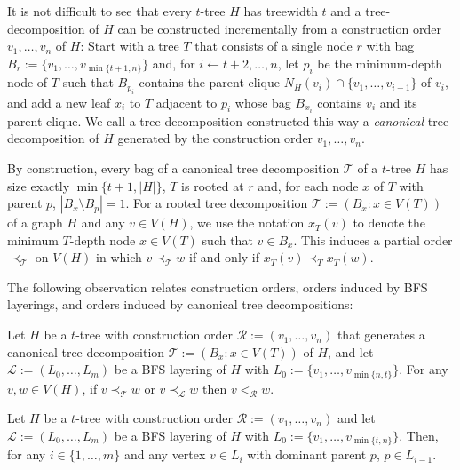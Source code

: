 \documentclass[kpfonts]{patmorin}
\theoremstyle{named}
\begin{document}
It is not difficult to see that every $t$-tree $H$ has treewidth $t$ and a tree-decomposition of $H$ can be constructed incrementally from a construction order $v_1,\ldots,v_n$ of $H$: Start with a tree $T$ that consists of a single node $r$ with bag $B_r:=\{v_1,\ldots,v_{\min\{t+1,n\}}\}$ and, for $i\gets t+2,\ldots,n$, let $p_i$ be the minimum-depth node of $T$ such that $B_{p_i}$ contains the parent clique $N_H(v_i)\cap\{v_1,\ldots,v_{i-1}\}$ of $v_i$, and add a new leaf $x_i$ to $T$ adjacent to $p_i$ whose bag $B_{x_i}$ contains $v_i$ and its parent clique.  We call a tree-decomposition constructed this way a \emph{canonical} tree decomposition of $H$ generated by the construction order $v_1,\ldots,v_n$.

By construction, every bag of a canonical tree decomposition $\mathcal{T}$ of a $t$-tree $H$ has size exactly $\min\{t+1,|H|\}$, $T$ is rooted at $r$ and, for each node $x$ of $T$ with parent $p$, $|B_x\setminus B_p|=1$.
For a rooted tree decomposition $\mathcal{T}:=(B_x:x\in V(T))$ of a graph $H$ and any $v\in V(H)$, we use the notation $x_T(v)$ to denote the minimum $T$-depth node $x\in V(T)$ such that $v\in B_x$.  This induces a partial order $\prec_{\mathcal{T}}$ on $V(H)$ in which $v\prec_{\mathcal{T}} w$ if and only if $x_T(v)\prec_T x_T(w)$.

The following observation relates construction orders, orders induced by BFS layerings, and orders induced by canonical tree decompositions:

\begin{obs}\label{order-relation}
    Let $H$ be a $t$-tree with construction order $\mathcal{R}:=(v_1,\ldots,v_n)$ that generates a canonical tree decomposition $\mathcal{T}:=(B_x:x\in V(T))$ of $H$, and let $\mathcal{L}:=(L_0,\ldots,L_m)$ be a BFS layering of $H$ with $L_0:=\{v_1,\ldots,v_{\min\{n,t\}}\}$.  For any $v,w\in V(H)$,
    if $v\prec_{\mathcal{T}} w$ or $v\prec_{\mathcal{L}} w$ then $v<_{\mathcal{R}} w$.
\end{obs}

\begin{obs}\label{dominant-parent}
    Let $H$ be a $t$-tree with construction order $\mathcal{R}:=(v_1,\ldots,v_n)$ and let $\mathcal{L}:=(L_0,\ldots,L_m)$ be a BFS layering of $H$ with $L_0:=\{v_1,\ldots,v_{\min\{t,n\}}\}$.  Then, for any $i\in\{1,\ldots,m\}$ and any vertex $v\in L_{i}$ with dominant parent $p$, $p\in L_{i-1}$.
\end{obs}
\end{document}
